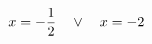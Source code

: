 \documentclass[preview]{standalone}
\begin{document}
\begin{align*}
\special{dvisvgm:raw <g id='unique000'>}x=- \frac{1}{2} \quad \lor \quad x=-2\special{dvisvgm:raw </g>}
\end{align*}
\end{document}
